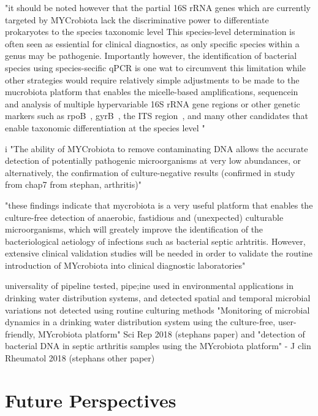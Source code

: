 "it should be noted however that the partial 16S rRNA genes which are currently targeted by MYCrobiota lack the discriminative power to differentiate prokaryotes to the species taxonomic level \cite{konstantinidis2007prokaryotic} This species-level  determination is often seen as essiential for clinical diagnostics, as only specific species within a genus may be pathogenie. Importantly however, the identification  of bacterial species using species-secific qPCR is one wat to circumvent this limitation while other strategies would require relatively simple adjustments to be made to the mucrobiota platform that enables the micelle-based amplifications, sequencein and analysis of multiple hypervariable 16S rRNA gene regions \cite{jumpstart2012evaluation} or other genetic markers such as rpoB~\cite{adekambi2009rpob}, gyrB~\cite{yanamoto1995pcr}, the ITS region~\cite{schoch20012nuclear}, and many other candidates that enable taxonomic differentiation at the species level \cite{lab2016marker,sabat2017targeted}"

i
"The ability of MYCrobiota to remove contaminating DNA allows the accurate detection of potentially pathogenic microorganisms at very low abundances, or alternatively, the confirmation of culture-negative results (confirmed in study from chap7 from stephan, arthritis)"


"these findings indicate that mycrobiota is a very useful platform that enables the culture-free detection of anaerobic, fastidious and (unexpected) culturable microorganisms, which will greately improve the identification of the bacteriological aetiology of infections such as bacterial septic arhtritis. However, extensive clinical validation studies will be needed in order to validate the routine introduction of MYcrobiota into clinical diagnostic laboratories"

universality of pipeline tested, pipe;ine used in environmental applications in drinking water distribution systems, and detected spatial and temporal microbial variations not detected using routine culturing methods "Monitoring of microbial dynamics in a drinking water distribution system using the culture-free, user-friendly, MYcrobiota platform" Sci Rep 2018 (stephans paper) and "detection of bacterial DNA in septic arthritis samples using the MYcrobiota platform" - J clin Rheumatol 2018 (stephans other paper)


\section{Future Perspectives}

